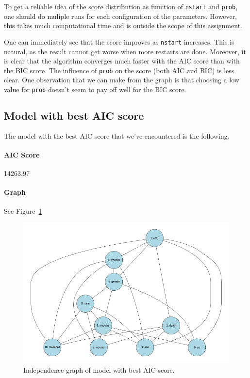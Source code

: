 \documentclass[12pt]{article}
\theoremstyle{definition}
\begin{document}
To get a reliable idea of the score distribution as function of \texttt{nstart} and \texttt{prob}, one should do muliple runs for each configuration of the parameters.
However, this takes much computational time and is outside the scope of this assignment.

One can immediately see that the score improves as \texttt{nstart} increases.
This is natural, as the result cannot get worse when more restarts are done.
Moreover, it is clear that the algorithm converges much faster with the AIC score than with the
BIC score.
The influence of \texttt{prob} on the score (both AIC and BIC) is less clear.
One observation that we can make from the graph is that choosing a low value for
\texttt{prob} doesn't seem to pay off well for the BIC score.

\subsection*{Model with best AIC score}
The model with the best AIC score that we've encountered is the following.

\paragraph{AIC Score} 14263.97

\paragraph{Graph} See Figure~\ref{fig:aic_best}

\begin{figure}[H]
    \centering
    \includegraphics[width=0.8\linewidth]{aic_best.png}
    \caption{Independence graph of model with best AIC score.}
\label{fig:aic_best}
\end{figure}
\end{document}
